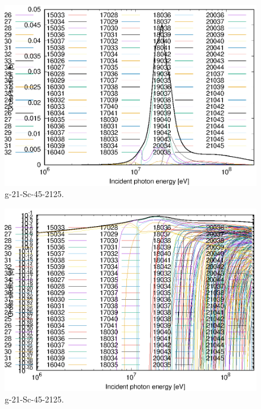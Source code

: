 \begin{figure}
 \includegraphics[width=\linewidth]{eps/g_21-Sc-45_2125.eps}
  \caption{g-21-Sc-45-2125.}
\end{figure}
\begin{figure}
 \includegraphics[width=\linewidth]{eps-log/g_21-Sc-45_2125.eps}
 \caption{g-21-Sc-45-2125.}
\end{figure}
\newpage \clearpage

